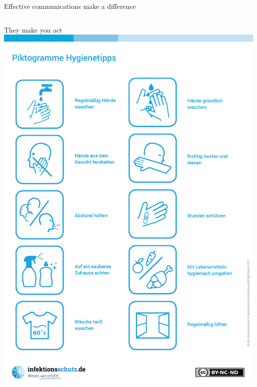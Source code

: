 \begin{frame}{Effective communications make a difference}
\begin{columns}
    \begin{column}{0.3\textwidth}
        \begin{block}{They make you act}
        \centering
            \includegraphics[width=\textwidth]{images/Piktogramme_Hygienetipps_300dpi.png}
        \end{block}

    \end{column}

\end{columns}

\end{frame}



